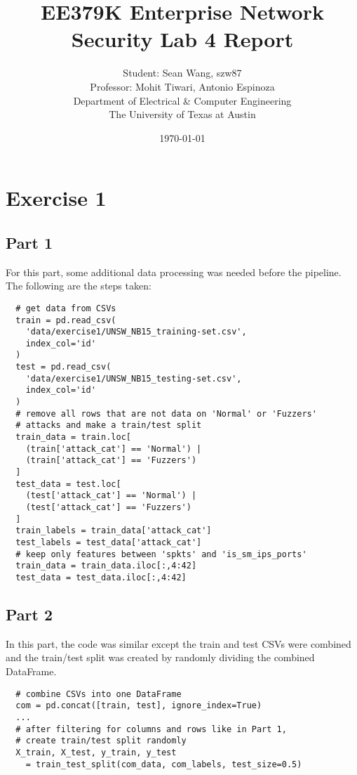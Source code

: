 \documentclass[11pt]{article}
\author{Student: Sean Wang, szw87 \\ Professor: Mohit Tiwari, Antonio Espinoza \\ Department of Electrical \& Computer Engineering \\ The University of Texas at Austin}
\date{\today}
\title{EE379K Enterprise Network Security Lab 4 Report}
\begin{document}
\maketitle
\section*{Exercise 1}
\subsection*{Part 1}
For this part, some additional data processing was needed before the pipeline. The following are the steps taken:
\begin{verbatim}
  # get data from CSVs
  train = pd.read_csv(
    'data/exercise1/UNSW_NB15_training-set.csv',
    index_col='id'
  )
  test = pd.read_csv(
    'data/exercise1/UNSW_NB15_testing-set.csv',
    index_col='id'
  )
  # remove all rows that are not data on 'Normal' or 'Fuzzers'
  # attacks and make a train/test split
  train_data = train.loc[
    (train['attack_cat'] == 'Normal') |
    (train['attack_cat'] == 'Fuzzers')
  ]
  test_data = test.loc[
    (test['attack_cat'] == 'Normal') | 
    (test['attack_cat'] == 'Fuzzers')
  ]
  train_labels = train_data['attack_cat']
  test_labels = test_data['attack_cat']
  # keep only features between 'spkts' and 'is_sm_ips_ports'
  train_data = train_data.iloc[:,4:42]
  test_data = test_data.iloc[:,4:42]
\end{verbatim}
\subsection*{Part 2}
In this part, the code was similar except the train and test CSVs were combined and the train/test split was created by randomly dividing the combined DataFrame.
\begin{verbatim}
  # combine CSVs into one DataFrame
  com = pd.concat([train, test], ignore_index=True)
  ...
  # after filtering for columns and rows like in Part 1,
  # create train/test split randomly
  X_train, X_test, y_train, y_test
    = train_test_split(com_data, com_labels, test_size=0.5)
\end{verbatim}
\end{document}
